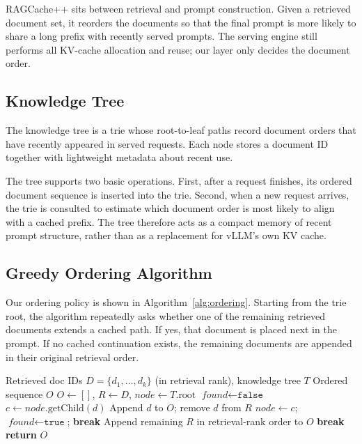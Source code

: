 \documentclass{article}
\begin{document}
RAGCache++ sits between retrieval and prompt construction. Given a retrieved document set, it reorders the documents so that the final prompt is more likely to share a long prefix with recently served prompts. The serving engine still performs all KV-cache allocation and reuse; our layer only decides the document order.

\subsection{Knowledge Tree}

The knowledge tree is a trie whose root-to-leaf paths record document orders that have recently appeared in served requests. Each node stores a document ID together with lightweight metadata about recent use.

The tree supports two basic operations. First, after a request finishes, its ordered document sequence is inserted into the trie. Second, when a new request arrives, the trie is consulted to estimate which document order is most likely to align with a cached prefix. The tree therefore acts as a compact memory of recent prompt structure, rather than as a replacement for vLLM's own KV cache.

\subsection{Greedy Ordering Algorithm}

Our ordering policy is shown in Algorithm~\ref{alg:ordering}. Starting from the trie root, the algorithm repeatedly asks whether one of the remaining retrieved documents extends a cached path. If yes, that document is placed next in the prompt. If no cached continuation exists, the remaining documents are appended in their original retrieval order.

\begin{algorithm}[t]
\caption{Cache-aware document ordering}
\label{alg:ordering}
\begin{algorithmic}[1]
\REQUIRE Retrieved doc IDs $D = \{d_1, \ldots, d_k\}$ (in retrieval rank), knowledge tree $T$
\ENSURE Ordered sequence $O$
\STATE $O \leftarrow []$, $R \leftarrow D$, $\textit{node} \leftarrow T.\text{root}$
    \STATE $\textit{found} \leftarrow \texttt{false}$
        \STATE $c \leftarrow \textit{node}.\text{getChild}(d)$
            \STATE Append $d$ to $O$; remove $d$ from $R$
            \STATE $\textit{node} \leftarrow c$; $\textit{found} \leftarrow \texttt{true}$; \textbf{break}
        \ENDIF
    \ENDFOR
        \STATE Append remaining $R$ in retrieval-rank order to $O$
        \STATE \textbf{break}
    \ENDIF
\ENDWHILE
\STATE \textbf{return} $O$
\end{algorithmic}
\end{algorithm}
\end{document}
